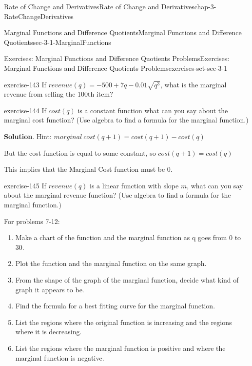\documentclass[oneside,10pt,]{book}
\numberwithin{equation}{section}
\begin{document}
\begin{chapterptx}{Rate of Change and Derivatives}{}{Rate of Change and Derivatives}{}{}{chap-3-RateChangeDerivatives}
\begin{sectionptx}{Marginal Functions and Difference Quotients}{}{Marginal Functions and Difference Quotients}{}{}{sec-3-1-MarginalFunctions}
\begin{exercises-subsection-numberless}{Exercises: Marginal Functions and Difference Quotients Problems}{}{Exercises: Marginal Functions and Difference Quotients Problems}{}{}{exercises-set-sec-3-1}
\begin{divisionexercise}{4}{}{}{exercise-143}%
\hypertarget{p-950}{}%
If \(revenue(q)=-500+7q-0.01\sqrt{q^3}\), what is the marginal revenue from selling the 100th item?%
\end{divisionexercise}%
\begin{divisionexercise}{5}{}{}{exercise-144}%
\hypertarget{p-951}{}%
If \(cost(q)\) is a constant function what can you say about the marginal cost function?  (Use algebra to find a formula for the marginal function.)%
\par\smallskip%
\noindent\textbf{Solution}.\hypertarget{solution-70}{}\quad%
\hypertarget{p-952}{}%
Hint: \(marginal\ cost(q+1)=cost(q+1)-cost(q)\)%
\par
\hypertarget{p-953}{}%
But the cost function is equal to some constant, so \(cost(q+1)=cost(q)\)%
\par
\hypertarget{p-954}{}%
This implies that the Marginal Cost function must be 0.%
\end{divisionexercise}%
\begin{divisionexercise}{6}{}{}{exercise-145}%
\hypertarget{p-955}{}%
If \(revenue(q)\) is a linear function with slope \(m\), what can you say about the marginal revenue function?  (Use algebra to find a formula for the marginal function.)%
\end{divisionexercise}%
\par\medskip\noindent%
\hypertarget{exercisegroup-13}{}%
\hypertarget{p-956}{}%
For problems 7-12:%
\leavevmode%
\begin{enumerate}[label=(\alph*)]
\item\hypertarget{li-279}{}\hypertarget{p-957}{}%
Make a chart of the function and the marginal function as q goes from 0 to 30.%
\item\hypertarget{li-280}{}\hypertarget{p-958}{}%
Plot the function and the marginal function on the same graph.%
\item\hypertarget{li-281}{}\hypertarget{p-959}{}%
From the shape of the graph of the marginal function, decide what kind of graph it appears to be.%
\item\hypertarget{li-282}{}\hypertarget{p-960}{}%
Find the formula for a best fitting curve for the marginal function.%
\item\hypertarget{li-283}{}\hypertarget{p-961}{}%
List the regions where the original function is increasing and the regions where it is decreasing.%
\item\hypertarget{li-284}{}\hypertarget{p-962}{}%
List the regions where the marginal function is positive and where the marginal function is negative.%

\end{enumerate}
\end{exercises-subsection-numberless}
\end{sectionptx}
\end{chapterptx}
\end{document}
